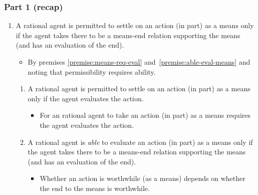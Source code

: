\documentclass[noamssymb,
]{beamer} %
\begin{document}
\begin{frame}
  \frametitle{Part 1 (recap)}

  \begin{enumerate}
\item\label{premise:permit-eval-means} A rational agent is permitted to settle on an action (in part) as a means only if the agent takes there to be a means-end relation supporting the means (and has an evaluation of the end).
    \begin{itemize}
    \item By premises \ref{premise:means-req-eval} and~\ref{premise:able-eval-means} and noting that permissibility requires ability.
    \end{itemize}
  \begin{enumerate}
  \item\label{premise:means-req-eval} A rational agent is permitted to settle on an action (in part) as a means only if the agent evaluates the action.
    \begin{itemize}
    \item For an rational agent to take an action (in part) as a means requires the agent evaluates the action.
    \end{itemize}
  \item\label{premise:able-eval-means} A rational agent is \emph{able} to evaluate an action (in part) as a means only if the agent takes there to be a means-end relation supporting the means (and has an evaluation of the end).
    \begin{itemize}
    \item Whether an action is worthwhile (as a means) depends on whether the end to the means is worthwhile.
    \end{itemize}
  \end{enumerate}
\end{enumerate}

\end{frame}
\end{document}
